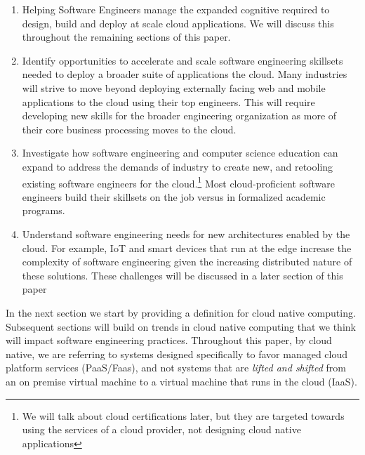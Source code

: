 \documentclass[conference]{IEEEconf}
\begin{document}
\begin{enumerate}
	\item \vspace{-0.2cm}Helping Software Engineers manage the expanded cognitive required to design, build and deploy at scale cloud applications. We will discuss this throughout the remaining sections of this paper. 
	
	\item \vspace{-0.2cm}Identify opportunities to accelerate and scale software engineering skillsets needed to deploy a broader suite of applications the cloud. Many industries will strive to move beyond deploying externally facing web and mobile applications to the cloud using their top engineers. This will require developing new skills for the broader engineering organization as more of their core business processing moves to the cloud.
	
	\item \vspace{-0.2cm}Investigate how software engineering and computer science education can expand to address the demands of industry to create new, and retooling existing software engineers for the cloud.\footnote{We will talk about cloud certifications later, but they are targeted towards using the services of a cloud provider, not designing cloud native applications} Most cloud-proficient software engineers build their skillsets on the job versus in formalized academic programs. 
	
	\item \vspace{-0.2cm}Understand software engineering needs for new architectures enabled by the cloud.  For example, IoT and smart devices that run at the edge increase the complexity of software engineering given the increasing distributed nature of these solutions.  These challenges will be discussed in a later section of this paper
\end{enumerate}

In the next section we start by providing a definition for cloud native computing. Subsequent sections will build on trends in cloud native computing that we think will impact software engineering practices.  Throughout this paper, by cloud native, we are referring to systems designed specifically to favor managed cloud platform services (PaaS/Faas)\cite{albuquerque2017function}, and not systems that are \textit{lifted and shifted}\cite{CloudMigration2017} from an on premise virtual machine to a virtual machine that runs in the cloud (IaaS). 
\end{document}
